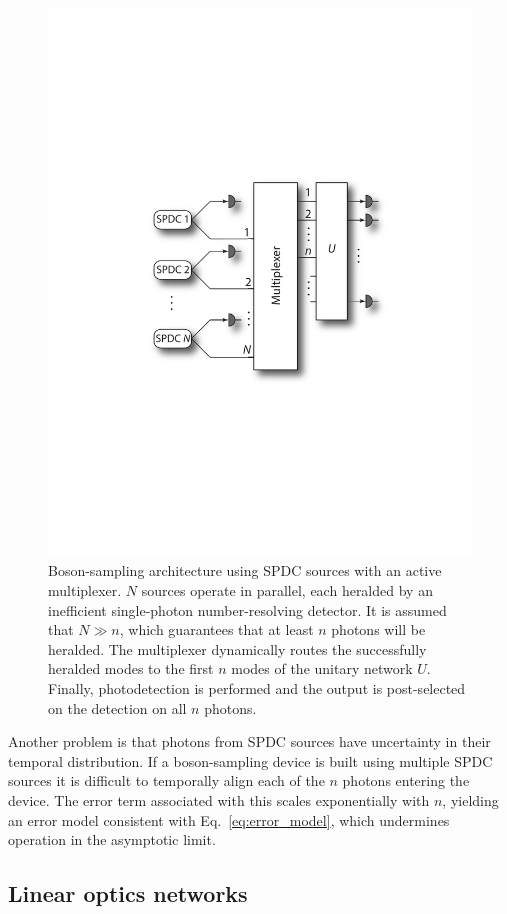\documentclass[aps,pra,twocolumn,amsmath,amssymb,nofootinbib,superscriptaddress]{revtex4}
\begin{document}
\begin{figure}[!htb]
\includegraphics[width=0.7\columnwidth]{multiplexing}
\caption{Boson-sampling architecture using SPDC sources with an active multiplexer. $N$ sources operate in parallel, each heralded by an inefficient single-photon number-resolving detector. It is assumed that \mbox{$N\gg n$}, which guarantees that at least $n$ photons will be heralded. The multiplexer dynamically routes the successfully heralded modes to the first $n$ modes of the unitary network $U$. Finally, photodetection is performed and the output is post-selected on the detection on all $n$ photons.}
\label{fig:multiplexing}
\end{figure}

Another problem is that photons from SPDC sources have uncertainty in their temporal distribution. If a boson-sampling device is built using multiple SPDC sources it is difficult to temporally align each of the $n$ photons entering the device. The error term associated with this scales exponentially with $n$, yielding an error model consistent with Eq.~\ref{eq:error_model}, which undermines operation in the asymptotic limit. 

\subsection{Linear optics networks}
\end{document}
